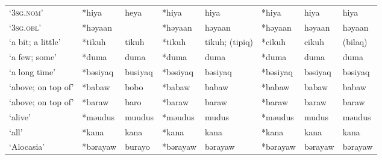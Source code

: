 \begin{landscape}
\begin{longtable}[c]{@{}p{3cm}<{\raggedright}p{2.75cm}<{\raggedright}p{2.75cm}<{\raggedright}p{2.75cm}<{\raggedright}p{2.75cm}<{\raggedright}p{2.75cm}<{\raggedright}p{2.75cm}<{\raggedright}p{2.75cm}<{\raggedright}@{}}
`\textsc{3sg.nom}'                                   & *hiya              & heya                           & *hiya              & hiya                       & *hiya            & hiya                     & hiya                              \\
`\textsc{3sg.obl}'                                   & *həyaan            &                                & *həyaan            & həyaan                     & *həyaan          & həyaan                   & həyaan                            \\
`a bit; a little'                                    & *tikuh             & tikuh                          & *tikuh             & tikuh; (tipiq)             & *cikuh           & cikuh                    & (bilaq)                           \\
`a few; some'                                        & *duma              & duma                           & *duma              & duma                       & *duma            & duma                     & duma                              \\
`a long time'                                        & *bəsiyaq           & busiyaq                        & *bəsiyaq           & bəsiyaq                    & *bəsiyaq         & bəsiyaq                  & bəsiyaq                           \\
`above; on top of'                                   & *babaw             & bobo                           & *babaw             & babaw                      & *babaw           & babaw                    & babaw                             \\
`above; on top of'                                   & *baraw             & baro                           & *baraw             & baraw                      & *baraw           & baraw                    & baraw                             \\
`alive'                                              & *məudus            & muudus                         & *məudus            & mudus                      & *məudus          & mudus                    & məudus                            \\
`all'                                                & *kana              & kana                           & *kana              & kana                       & *kana            & kana                     & kana                              \\
`Alocasia'                                           & *bərayaw           & burayo                         & *bərayaw           & bərayaw                    & *bərayaw         & bərayaw                  & bərayaw                           \\

\end{longtable}
\end{landscape}
